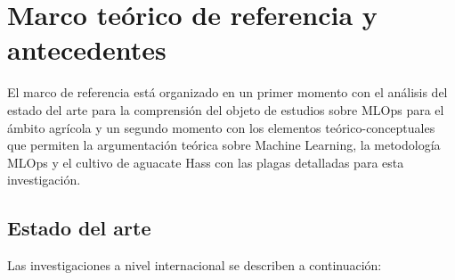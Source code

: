 \section{Marco teórico de referencia y antecedentes}

El marco de referencia está organizado en un primer momento con el análisis del estado del arte para la comprensión del objeto de estudios sobre MLOps para el ámbito agrícola y un segundo momento con los elementos teórico-conceptuales que permiten la argumentación teórica sobre Machine Learning, la metodología MLOps y el cultivo de aguacate Hass con las plagas detalladas para esta investigación.

\subsection{Estado del arte}
Las investigaciones a nivel internacional se describen a continuación:

